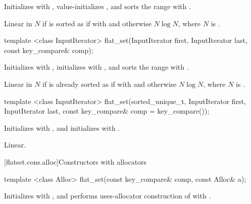 \begin{codeblock}
\begin{codeblock}
\begin{codeblock}
\begin{addedblock}
\begin{itemdescr}
\pnum
\effects Initializes  with , value-initializes
, and sorts the range  with
.

\pnum
\complexity
Linear in $N$ if  is sorted as if with  and
otherwise $N \log N$, where $N$ is .
\end{itemdescr}

%
\begin{itemdecl}
template <class InputIterator>
  flat_set(InputIterator first, InputIterator last, const key_compare& comp);
\end{itemdecl}

\begin{itemdescr}
\pnum
\effects Initializes  with , initializes 
with , and sorts the range 
with .

\pnum
\complexity
Linear in $N$ if  is already sorted as if with  and
otherwise $N \log N$, where $N$ is .
\end{itemdescr}

%
\begin{itemdecl}
template <class InputIterator>
  flat_set(sorted_unique_t, InputIterator first, InputIterator last,
           const key_compare& comp = key_compare());
\end{itemdecl}

\begin{itemdescr}
\pnum
\effects Initializes  with , and initializes
 with .

\pnum
\complexity
Linear.
\end{itemdescr}

[flatset.cons.alloc]{Constructors with allocators}

%
\begin{itemdecl}
template <class Alloc>
  flat_set(const key_compare& comp, const Alloc& a);
\end{itemdecl}

\begin{itemdescr}
\pnum
\effects Initializes  with , and performs
uses-allocator construction of
 with .


\end{itemdescr}
\end{addedblock}
\end{codeblock}
\end{codeblock}
\end{codeblock}
